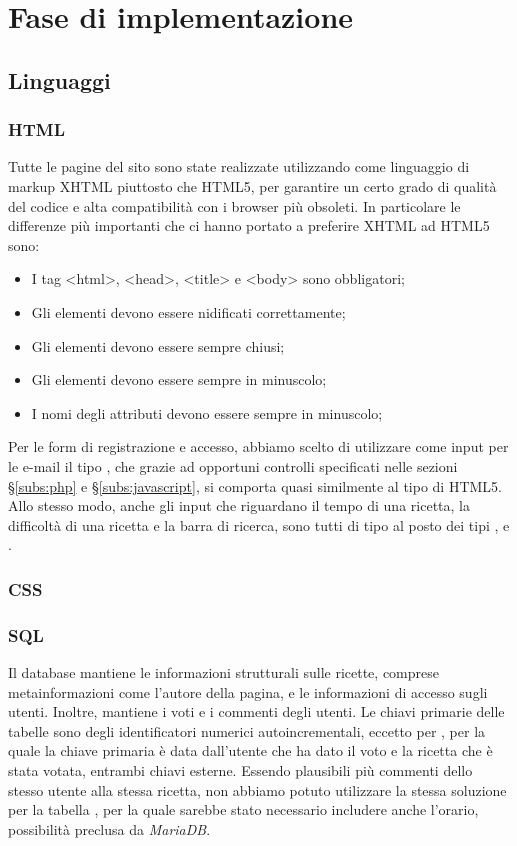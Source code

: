 \section{Fase di implementazione}
\label{sec:fase_di_implementazione}
\subsection{Linguaggi}
\subsubsection{HTML}
Tutte le pagine del sito sono state realizzate utilizzando come linguaggio di markup XHTML piuttosto che HTML5, per garantire un certo grado di qualità del codice e alta compatibilità con i browser più obsoleti. In particolare le differenze più importanti che ci hanno portato a preferire XHTML ad HTML5 sono:
\begin{itemize}
	\item I tag <html>, <head>, <title> e <body> sono obbligatori;
	\item Gli elementi devono essere nidificati correttamente;
	\item Gli elementi devono essere sempre chiusi;
	\item Gli elementi devono essere sempre in minuscolo;
	\item I nomi degli attributi devono essere sempre in minuscolo;
\end{itemize}
Per le form di registrazione e accesso, abbiamo scelto di utilizzare come input per le e-mail il tipo , che grazie ad opportuni controlli specificati nelle sezioni \S\ref{subs:php} e \S\ref{subs:javascript}, si comporta quasi similmente al tipo  di HTML5. Allo stesso modo, anche gli input che riguardano il tempo di una ricetta, la difficoltà di una ricetta e la barra di ricerca, sono tutti di tipo  al posto dei tipi ,  e .

\subsubsection{CSS}

\subsubsection{SQL}
Il database mantiene le informazioni strutturali sulle ricette, comprese metainformazioni come l'autore della pagina, e le informazioni di accesso sugli utenti.
Inoltre, mantiene i voti e i commenti degli utenti.
Le chiavi primarie delle tabelle sono degli identificatori numerici autoincrementali, eccetto per , per la quale la chiave primaria è data dall'utente che ha dato il voto e la ricetta che è stata votata, entrambi chiavi esterne.
Essendo plausibili più commenti dello stesso utente alla stessa ricetta, non abbiamo potuto utilizzare la stessa soluzione per la tabella , per la quale sarebbe stato necessario includere anche l'orario, possibilità preclusa da \textit{MariaDB}.

